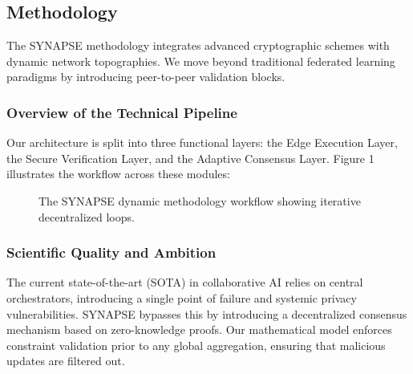 \subsection{Methodology}
\label{sec:methodology}

The SYNAPSE methodology integrates advanced cryptographic schemes with dynamic network topographies. We move beyond traditional federated learning paradigms by introducing peer-to-peer validation blocks.

\subsubsection{Overview of the Technical Pipeline}
Our architecture is split into three functional layers: the Edge Execution Layer, the Secure Verification Layer, and the Adaptive Consensus Layer. Figure 1 illustrates the workflow across these modules:

\begin{figure}[h]
\centering
{}
\caption{The SYNAPSE dynamic methodology workflow showing iterative decentralized loops.}
\label{fig:workflow}
\end{figure}

\subsubsection{Scientific Quality and Ambition}
The current state-of-the-art (SOTA) in collaborative AI relies on central orchestrators, introducing a single point of failure and systemic privacy vulnerabilities. SYNAPSE bypasses this by introducing a decentralized consensus mechanism based on zero-knowledge proofs. Our mathematical model enforces constraint validation prior to any global aggregation, ensuring that malicious updates are filtered out.

